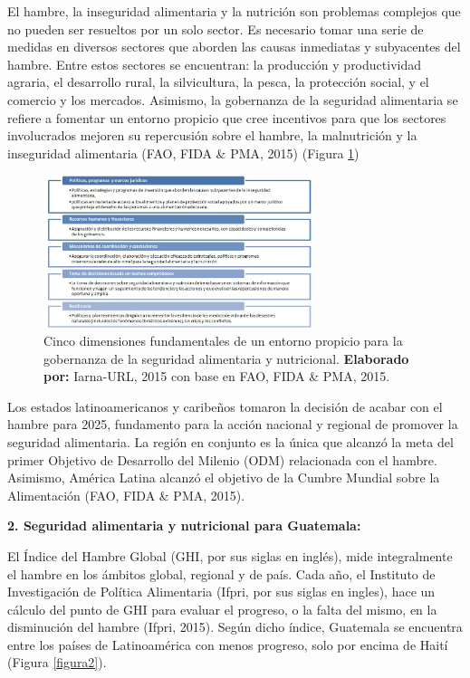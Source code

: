 El hambre, la inseguridad alimentaria y la nutrición son problemas complejos que no pueden ser resueltos por un solo sector. Es necesario tomar una serie de medidas en diversos sectores que aborden las causas inmediatas y subyacentes del hambre. Entre estos sectores se encuentran: la producción y productividad agraria, el desarrollo rural, la silvicultura, la pesca, la protección social, y el comercio y los mercados. Asimismo, la gobernanza de la seguridad alimentaria se refiere a fomentar un entorno propicio que cree incentivos para que los sectores involucrados mejoren su repercusión sobre el hambre, la malnutrición y la inseguridad alimentaria (FAO, FIDA \& PMA, 2015) (Figura \ref{figura1})

\begin{figure}
		\centering
	\includegraphics[width=0.7\textwidth]{figura1}
	\caption{Cinco dimensiones fundamentales de un entorno propicio para la gobernanza de la seguridad alimentaria y nutricional. \textbf{Elaborado por:} Iarna-URL, 2015 con base en FAO, FIDA \& PMA, 2015.}
	\label{figura1}
\end{figure}
Los estados latinoamericanos y caribeños tomaron la decisión de acabar con el hambre para 2025, fundamento para la acción nacional y regional de promover la seguridad alimentaria. La región en conjunto es la única que alcanzó la meta del primer Objetivo de Desarrollo del Milenio (ODM) relacionada con el hambre. Asimismo, América Latina alcanzó el objetivo de la Cumbre Mundial sobre la Alimentación (FAO, FIDA \& PMA, 2015). 


\noindent\textbf{2.	Seguridad alimentaria y nutricional para Guatemala:}

El Índice del Hambre Global (GHI, por sus siglas en inglés), mide integralmente el hambre en los ámbitos global, regional y de país. Cada año, el Instituto de Investigación de Política Alimentaria (Ifpri, por sus siglas en ingles), hace un cálculo del punto de GHI para evaluar el progreso, o la falta del mismo, en la disminución del hambre (Ifpri, 2015). Según dicho índice, Guatemala se encuentra entre los países de Latinoamérica con menos progreso, solo por encima de Haití (Figura \ref{figura2}). 


